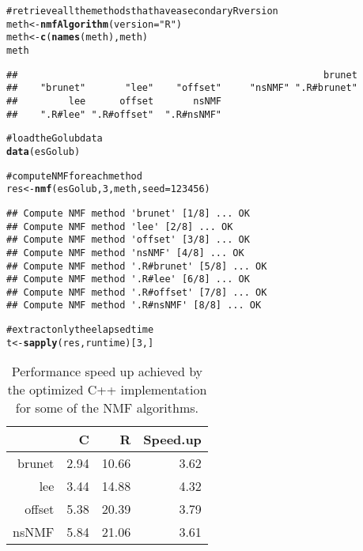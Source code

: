 \documentclass[a4paper]{article}\usepackage{graphicx, color}
\makeatletter
\newcommand{\hlfunctioncall}[1]{\textcolor[rgb]{0.501960784313725,0,0.329411764705882}{\textbf{#1}}}%
\newcommand{\hlstring}[1]{\textcolor[rgb]{0.6,0.6,1}{#1}}%
\newcommand{\hlcomment}[1]{\textcolor[rgb]{0.180392156862745,0.6,0.341176470588235}{#1}}%
\newenvironment{kframe}{%
 \def\at@end@of@kframe{}%
 \ifinner\ifhmode%
  \def\at@end@of@kframe{\end{minipage}}%
  \begin{minipage}{\columnwidth}%
 \fi\fi%
 \def\FrameCommand##1{\hskip\@totalleftmargin \hskip-\fboxsep
 \colorbox{shadecolor}{##1}\hskip-\fboxsep
     \hskip-\linewidth \hskip-\@totalleftmargin \hskip\columnwidth}%
 \MakeFramed {\advance\hsize-\width
   \@totalleftmargin\z@ \linewidth\hsize
   \@setminipage}}%
 {\par\unskip\endMakeFramed%
 \at@end@of@kframe}
\newenvironment{knitrout}{}{} %
\makeatother
\begin{document}
\begin{knitrout}
\color{fgcolor}\begin{kframe}
\begin{alltt}
\hlcomment{# retrieve all the methods that have a secondary R version}
meth <- \hlfunctioncall{nmfAlgorithm}(version = \hlstring{"R"})
meth <- \hlfunctioncall{c}(\hlfunctioncall{names}(meth), meth)
meth
\end{alltt}
\begin{verbatim}
##                                                      brunet 
##    "brunet"       "lee"    "offset"     "nsNMF" ".R#brunet" 
##         lee      offset       nsNMF 
##    ".R#lee" ".R#offset"  ".R#nsNMF"
\end{verbatim}
\begin{alltt}

\hlcomment{# load the Golub data}
\hlfunctioncall{data}(esGolub)

\hlcomment{# compute NMF for each method}
res <- \hlfunctioncall{nmf}(esGolub, 3, meth, seed = 123456)
\end{alltt}
\begin{verbatim}
## Compute NMF method 'brunet' [1/8] ... OK
## Compute NMF method 'lee' [2/8] ... OK
## Compute NMF method 'offset' [3/8] ... OK
## Compute NMF method 'nsNMF' [4/8] ... OK
## Compute NMF method '.R#brunet' [5/8] ... OK
## Compute NMF method '.R#lee' [6/8] ... OK
## Compute NMF method '.R#offset' [7/8] ... OK
## Compute NMF method '.R#nsNMF' [8/8] ... OK
\end{verbatim}
\begin{alltt}

\hlcomment{# extract only the elapsed time}
t <- \hlfunctioncall{sapply}(res, runtime)[3, ]
\end{alltt}
\end{kframe}
\end{knitrout}


\begin{table}[ht]
\centering
\begin{tabular}{rrrr}
  \hline
 & C & R & Speed.up \\ 
  \hline
brunet & 2.94 & 10.66 & 3.62 \\ 
  lee & 3.44 & 14.88 & 4.32 \\ 
  offset & 5.38 & 20.39 & 3.79 \\ 
  nsNMF & 5.84 & 21.06 & 3.61 \\ 
   \hline
\end{tabular}
\caption{Performance speed up achieved by the optimized C++ implementation for some of the NMF algorithms.} 
\label{tab:perf}
\end{table}
\end{document}
